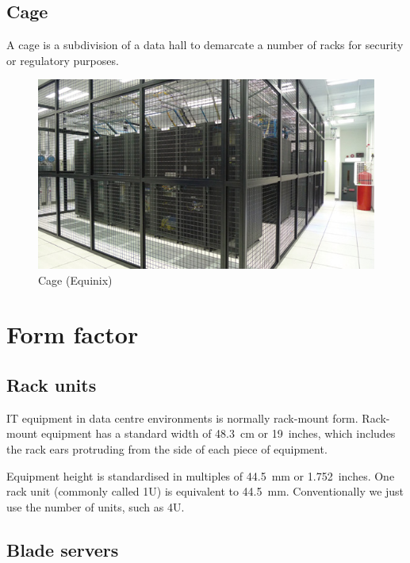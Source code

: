 \subsection{Cage}

A cage is a subdivision of a data hall to demarcate a number of racks for security or regulatory purposes.

\begin{figure}[htbp]
  \centering
  \includegraphics[width=1.0\linewidth]{cage}
  \caption{Cage (Equinix)}
  \label{fig:cage}
\end{figure}


\section{Form factor}

\subsection{Rack units}

IT equipment in data centre environments is normally rack-mount form.
Rack-mount equipment has a standard width of \SI{48.3}{\centi\metre} or 19~inches, which includes the rack ears protruding from the side of each piece of equipment.

Equipment height is standardised in multiples of \SI{44.5}{\milli\metre} or 1.752~inches.
One rack unit (commonly called 1U) is equivalent to \SI{44.5}{\milli\metre}.
Conventionally we just use the number of units, such as 4U.

\subsection{Blade servers}


